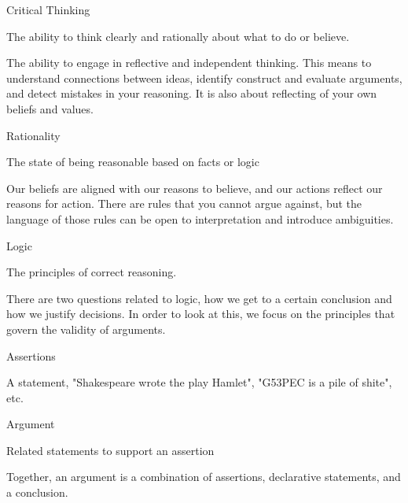\documentclass[]{../../DefinitionFormat}
\begin{document}
\begin{definition}{Critical Thinking}
	\begin{summary}
	The ability to think clearly and rationally about what to do or believe.
	\end{summary}
	
	\par The ability to engage in reflective and independent thinking. This means to understand connections between ideas, identify construct and evaluate arguments, and detect mistakes in your reasoning. It is also about reflecting of your own beliefs and values.
\end{definition}

\begin{definition}{Rationality}
	\begin{summary}
		The state of being reasonable based on facts or logic
	\end{summary}
	
	\par Our beliefs are aligned with our reasons to believe, and our actions reflect our reasons for action. There are rules that you cannot argue against, but the language of those rules can be open to interpretation and introduce ambiguities.
\end{definition}

\begin{definition}{Logic}
	\begin{summary}
		The principles of correct reasoning.
	\end{summary}
	
	\par There are two questions related to logic, how we get to a certain conclusion and how we justify decisions. In order to look at this, we focus on the principles that govern the validity of arguments.
\end{definition}

\begin{definition}{Assertions}
	
	\par A statement, "Shakespeare wrote the play Hamlet", "G53PEC is a pile of shite", etc.
\end{definition}


\begin{definition}{Argument}
	\begin{summary}
		Related statements to support an assertion
	\end{summary}
		
	\par Together, an argument is a combination of assertions, declarative statements, and a conclusion.
\end{definition}
\end{document}
